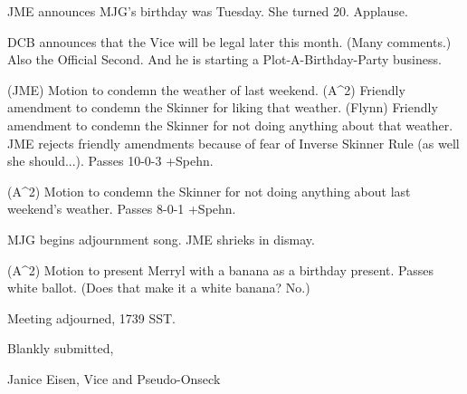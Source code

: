 \documentclass[12pt]{article}
\begin{document}
JME announces MJG's birthday was Tuesday. She turned 20. Applause.

DCB announces that the Vice will be legal later this month. (Many comments.) Also the Official Second. And he is starting a Plot-A-Birthday-Party business.

(JME) Motion to condemn the weather of last weekend. (A^2) Friendly amendment to condemn the Skinner for liking that weather. (Flynn) Friendly amendment to condemn the Skinner for not doing anything about that weather. JME rejects friendly amendments because of fear of Inverse Skinner Rule (as well she should...). Passes 10-0-3 +Spehn.

(A^2) Motion to condemn the Skinner for not doing anything about last weekend's weather. Passes 8-0-1 +Spehn.

MJG begins adjournment song. JME shrieks in dismay.

(A^2) Motion to present Merryl with a banana as a birthday present. Passes white ballot. (Does that make it a white banana? No.)

\vspace{12pt}

\noindent
Meeting adjourned, 1739 SST.

\vspace{18pt}

\centerline{Blankly submitted,}
\centerline{Janice Eisen, Vice and Pseudo-Onseck}
\end{document}
